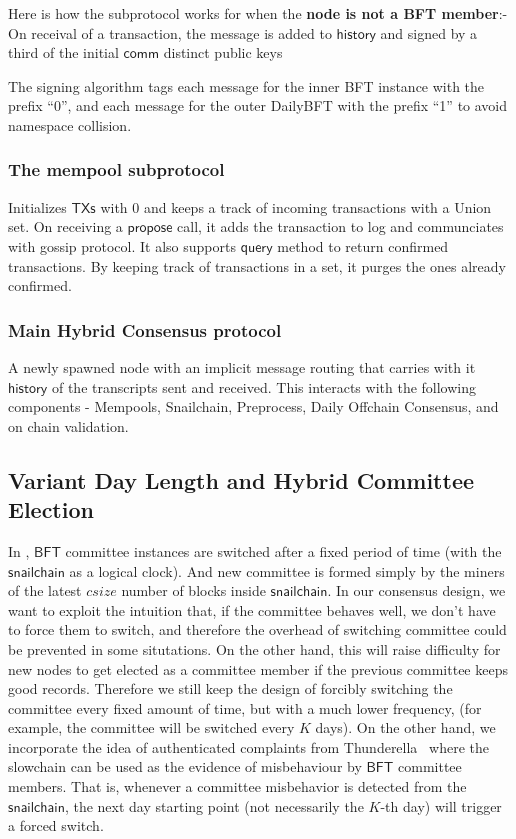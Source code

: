 \documentclass[9pt,oneside]{amsart}
\begin{document}
\begin{multicols}{2}
Here is how the subprotocol works for when the \textbf{node is not a BFT member}:-
On receival of a transaction, the message is added to $\mathsf{history}$ and signed by a third of the initial
$\mathsf{comm}$ distinct public keys

The signing algorithm tags each message for the inner BFT instance
with the prefix “0”, and each message for the outer DailyBFT with the prefix “1” to avoid namespace collision.

\subsubsection{The mempool subprotocol}

Initializes $\mathsf{TXs}$ with 0 and keeps a track of incoming transactions with a Union set. On receiving a $\mathsf{propose}$ call, it adds the
transaction to log and communciates with gossip protocol. It also supports $\mathsf{query}$ method to return confirmed transactions. By keeping
track of transactions in a set, it purges the ones already confirmed.

\subsubsection{Main Hybrid Consensus protocol}

A newly spawned node with an implicit message routing that carries with it $\mathsf{history}$ of the transcripts sent and received.
This interacts with the following components - Mempools, Snailchain, Preprocess, Daily Offchain Consensus, and on chain validation.

\subsection{Variant Day Length and Hybrid Committee Election}
\label{sec:election}
In \cite{pass2017hybrid}, $\mathsf{BFT}$ committee instances are switched after a fixed period of time (with the $\mathsf{snailchain}$ as a logical clock).
And new committee is formed simply by the miners of the latest $csize$ number of blocks inside $\mathsf{snailchain}$. In our consensus design, we want to exploit
the intuition that, if the committee behaves well, we don't have to force them to switch, and therefore the overhead of switching committee could be prevented in
some situtations. On the other hand, this will raise difficulty for new nodes to get elected as a committee member if the previous committee keeps good records.
Therefore we still keep the design of forcibly switching the committee every fixed amount of time, but with a much lower frequency, (for example, the committee
will be switched every $K$ days). On the other hand, we incorporate the idea of authenticated complaints from Thunderella~\cite{pass2017thunderella} where the
slowchain can be used as the evidence of misbehaviour by $\mathsf{BFT}$ committee members. That is, whenever a committee misbehavior is detected from the
$\mathsf{snailchain}$, the next day starting point (not necessarily the $K$-th day) will trigger a forced switch.


\end{multicols}
\end{document}
